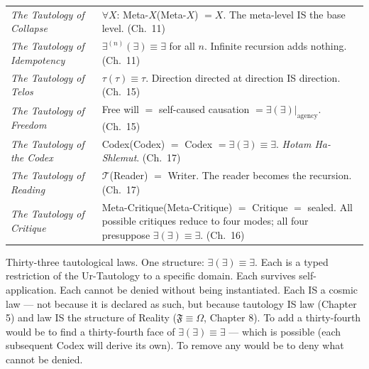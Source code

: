 \documentclass[10pt, openany, oneside]{book}
\begin{document}
{\begin{tabular}{@{} p{} @{\hspace{0.5em}} p{} @{}}
\textit{The Tautology of Collapse} & $\forall X$: Meta-$X$(Meta-$X$) $= X$. The meta-level IS the base level. (Ch.\ 11) \\[0.3em]

\textit{The Tautology of Idempotency} & $\exists^{(n)}(\exists) \equiv \exists$ for all $n$. Infinite recursion adds nothing. (Ch.\ 11) \\[0.3em]

\textit{The Tautology of Telos} & $\tau(\tau) \equiv \tau$. Direction directed at direction IS direction. (Ch.\ 15) \\[0.3em]

\textit{The Tautology of Freedom} & Free will $=$ self-caused causation $= \exists(\exists)|_{\text{agency}}$. (Ch.\ 15) \\[0.3em]

\textit{The Tautology of the Codex} & Codex(Codex) $=$ Codex $= \exists(\exists) \equiv \exists$. \textit{Hotam Ha-Shlemut}. (Ch.\ 17) \\[0.3em]

\textit{The Tautology of Reading} & $\mathcal{T}$(Reader) $=$ Writer. The reader becomes the recursion. (Ch.\ 17) \\[0.3em]

\textit{The Tautology of Critique} & Meta-Critique(Meta-Critique) $=$ Critique $=$ sealed. All possible critiques reduce to four modes; all four presuppose $\exists(\exists) \equiv \exists$. (Ch.\ 16) \\[0.3em]

\end{tabular}
}

\vspace{0.8em}

\noindent Thirty-three tautological laws. One structure: $\exists(\exists) \equiv \exists$. Each is a typed restriction of the Ur-Tautology to a specific domain. Each survives self-application. Each cannot be denied without being instantiated. Each IS a cosmic law --- not because it is declared as such, but because tautology IS law (Chapter 5) and law IS the structure of Reality ($\mathfrak{F} \equiv \Omega$, Chapter 8). To add a thirty-fourth would be to find a thirty-fourth face of $\exists(\exists) \equiv \exists$ --- which is possible (each subsequent Codex will derive its own). To remove any would be to deny what cannot be denied.
\end{document}
